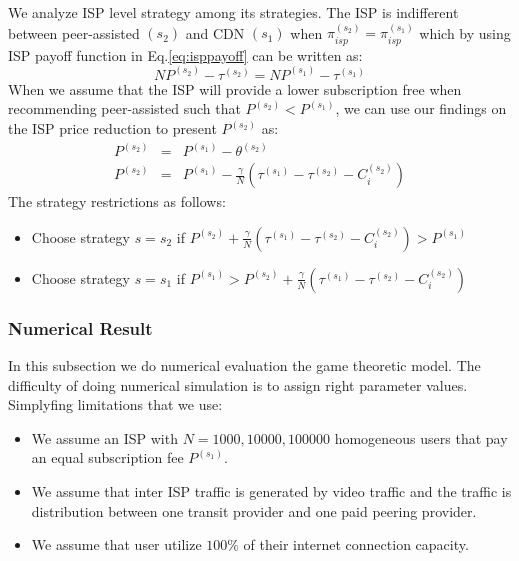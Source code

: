 \documentclass[paper]{ieice}
\begin{document}
We analyze ISP level strategy among its strategies.
The ISP is indifferent between peer-assisted $(s_2)$ and CDN $(s_1)$ when $\pi^{(s_2)}_{isp} = \pi^{(s_1)}_{isp}$
which by using ISP payoff function in Eq.\ref{eq:isppayoff} can be written as: 
\begin{equation}
	N P^{(s_2)} - \tau^{(s_2)} = N P^{(s_1)} - \tau^{(s_1)}
\end{equation}
When we assume that the ISP will provide a lower subscription free when recommending peer-assisted such that $P^{(s_2)} < P^{(s_1)}$, we can use our findings on the ISP price reduction to present $P^{(s_2)}$ as:
\begin{eqnarray}
	\nonumber P^{(s_2)} &=& P^{(s_1)} - \theta^{(s_2)} \\
	P^{(s_2)} &=& P^{(s_1)} - \frac{\gamma}{N} (\tau^{(s_1)} - \tau^{(s_2)} - C^{(s_2)}_i )
\end{eqnarray}
The strategy restrictions as follows:
\begin{itemize}
	\item Choose strategy $s=s_2$ if $ P^{(s_2)} + \frac{\gamma}{N} (\tau^{(s_1)} - \tau^{(s_2)} - C^{(s_2)}_i ) > P^{(s_1)}$
	\item Choose strategy $s=s_1$ if $ P^{(s_1)} > P^{(s_2)} + \frac{\gamma}{N} (\tau^{(s_1)} - \tau^{(s_2)} - C^{(s_2)}_i )$ 
\end{itemize}

\subsubsection{Numerical Result}
In this subsection we do numerical evaluation the game theoretic model. 
The difficulty of doing numerical simulation is to assign right parameter values.
Simplyfing limitations that we use: 
\begin{itemize}
	\item We assume an ISP with $N=1000,10000,100000$ homogeneous users that pay an equal subscription fee $P^{(s_1)}$.
	\item We assume that inter ISP traffic is generated by video traffic and the traffic is distribution between one transit provider and one paid peering provider.
	\item We assume that user utilize $100\%$ of their internet connection capacity.  
\end{itemize}


\end{document}
